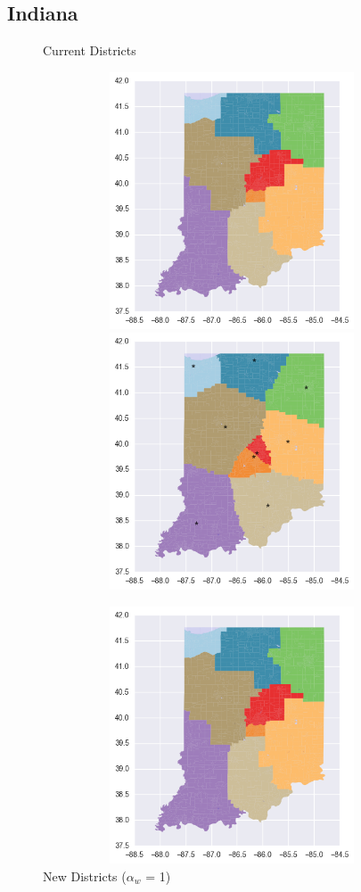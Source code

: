 \clearpage
\newpage

\subsection{Indiana}
\begin{figure}[htb!] \centering
\caption{ Current Districts }
\includegraphics[width=5in,height=3in,keepaspectratio]{../maps/IN/static/before.png}
\includegraphics[width=5in,height=3in,keepaspectratio]{../maps/IN/static/0_0_after.png}
\caption{ New Districts ($\alpha_w$ = 1) }
\includegraphics[width=5in,height=3in,keepaspectratio]{../maps/IN/static/before.png}

\end{figure}
